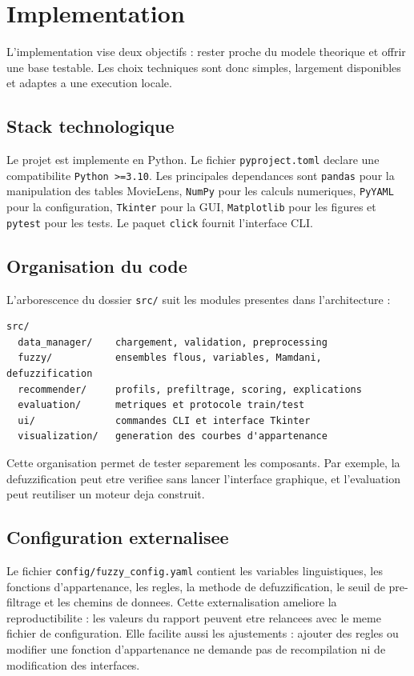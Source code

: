 \section{Implementation}

L'implementation vise deux objectifs : rester proche du modele theorique et offrir une base testable. Les choix techniques sont donc simples, largement disponibles et adaptes a une execution locale.

\subsection{Stack technologique}

Le projet est implemente en Python. Le fichier \texttt{pyproject.toml} declare une compatibilite \texttt{Python >=3.10}. Les principales dependances sont \texttt{pandas} pour la manipulation des tables MovieLens, \texttt{NumPy} pour les calculs numeriques, \texttt{PyYAML} pour la configuration, \texttt{Tkinter} pour la GUI, \texttt{Matplotlib} pour les figures et \texttt{pytest} pour les tests. Le paquet \texttt{click} fournit l'interface CLI.

\subsection{Organisation du code}

L'arborescence du dossier \texttt{src/} suit les modules presentes dans l'architecture :
\begin{verbatim}
src/
  data_manager/    chargement, validation, preprocessing
  fuzzy/           ensembles flous, variables, Mamdani, defuzzification
  recommender/     profils, prefiltrage, scoring, explications
  evaluation/      metriques et protocole train/test
  ui/              commandes CLI et interface Tkinter
  visualization/   generation des courbes d'appartenance
\end{verbatim}

Cette organisation permet de tester separement les composants. Par exemple, la defuzzification peut etre verifiee sans lancer l'interface graphique, et l'evaluation peut reutiliser un moteur deja construit.

\subsection{Configuration externalisee}

Le fichier \texttt{config/fuzzy\_config.yaml} contient les variables linguistiques, les fonctions d'appartenance, les regles, la methode de defuzzification, le seuil de pre-filtrage et les chemins de donnees. Cette externalisation ameliore la reproductibilite : les valeurs du rapport peuvent etre relancees avec le meme fichier de configuration. Elle facilite aussi les ajustements : ajouter des regles ou modifier une fonction d'appartenance ne demande pas de recompilation ni de modification des interfaces.

